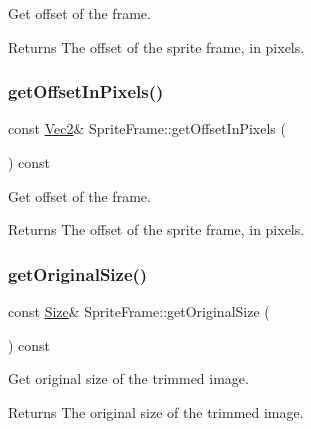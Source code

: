 Get offset of the frame.

\begin{DoxyReturn}{Returns}
The offset of the sprite frame, in pixels. 
\end{DoxyReturn}
\mbox{\label{classSpriteFrame_aea3d0cacb447d45c0c2d8cfb99a74b37}} 
\subsubsection{\texorpdfstring{get\+Offset\+In\+Pixels()}{getOffsetInPixels()}\hspace{0.1cm}{\footnotesize\ttfamily [2/2]}}
{\footnotesize\ttfamily const \hyperlink{classVec2}{Vec2}\& Sprite\+Frame\+::get\+Offset\+In\+Pixels (\begin{DoxyParamCaption}{ }\end{DoxyParamCaption}) const}

Get offset of the frame.

\begin{DoxyReturn}{Returns}
The offset of the sprite frame, in pixels. 
\end{DoxyReturn}
\mbox{\label{classSpriteFrame_a84fd321bbc5f807dd5a5c48e371c7058}} 
\subsubsection{\texorpdfstring{get\+Original\+Size()}{getOriginalSize()}\hspace{0.1cm}{\footnotesize\ttfamily [1/2]}}
{\footnotesize\ttfamily const \hyperlink{classSize}{Size}\& Sprite\+Frame\+::get\+Original\+Size (\begin{DoxyParamCaption}{ }\end{DoxyParamCaption}) const\hspace{0.3cm}{\ttfamily [inline]}}

Get original size of the trimmed image.

\begin{DoxyReturn}{Returns}
The original size of the trimmed image. 
\end{DoxyReturn}
\mbox{\label{classSpriteFrame_a84fd321bbc5f807dd5a5c48e371c7058}} 

